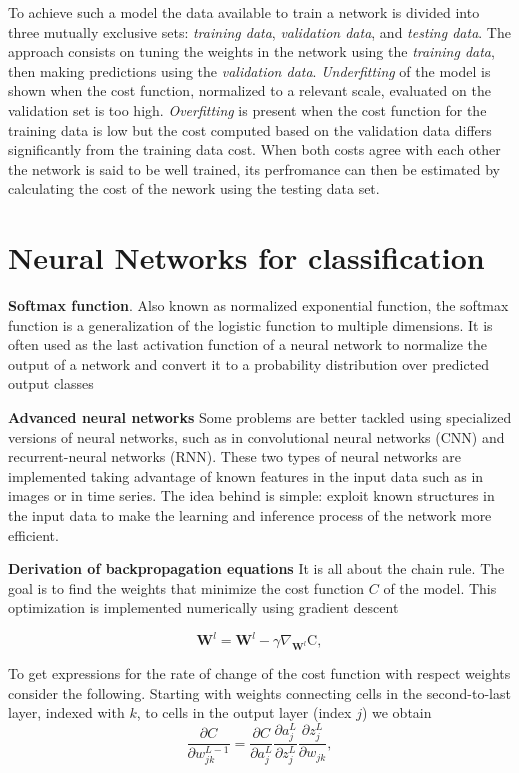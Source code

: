 \documentclass[11pt,onecolumn]{article}
\begin{document}
To achieve such a model the data available to train a network is divided into three mutually exclusive sets: 
\emph{training data}, \emph{validation data}, and \emph{testing data}. 
The approach consists on tuning the weights in the 
network using the \emph{training data}, then making predictions using the \emph{validation data}. 
\emph{Underfitting} of the model is shown when the cost function, normalized to a relevant scale,  evaluated on the validation set 
is too high. 
\emph{Overfitting} is present when the cost function for the training data is low but the cost computed based on 
the validation data differs significantly from the training data cost. 
When both costs agree with each other the network is said to be well trained, its perfromance can then be 
estimated by calculating the cost of the nework using the testing data set. 

\section{Neural Networks for classification} 
\textbf{Softmax function}.  Also known as normalized exponential function, the softmax function is a generalization of the logistic function to multiple dimensions. It is often used as the last activation function of a neural network to normalize the output of a network and convert it to a probability distribution over predicted output classes

\textbf{Advanced neural networks}
Some problems are better tackled using specialized versions of neural networks, such as in convolutional 
neural networks (CNN) and recurrent-neural networks (RNN). These two types of neural networks are 
implemented taking advantage of known features in the input data such as in images or in time series. 
The idea behind is simple: exploit known structures in the input data to make the learning and inference 
process of the network more efficient.

\textbf{Derivation of backpropagation equations} It is all about the chain rule. The goal is to find
the weights that minimize the cost function $C$ of the model. This optimization is implemented numerically 
using gradient descent 

\begin{equation}
	\mathbf{W}^{l} = \mathbf{W}^{l} - \gamma \nabla_{\mathbf{W}^{l}} \mathrm{C},
\end{equation}

To get expressions for the rate of change of the cost function with respect weights consider the following.
Starting with weights connecting cells in the second-to-last layer, indexed with $k$, to cells in the output 
layer (index $j$) we obtain 
\begin{equation}
    \frac{\partial C}{\partial w^{L-1}_{jk}} =  \frac{\partial C}{\partial a^{L}_j} 
                                               \frac{\partial a^{L}_j}{\partial z^{L}_j}
                                               \frac{\partial z^{L}_j}{\partial w_{jk} },
\end{equation}
\end{document}
